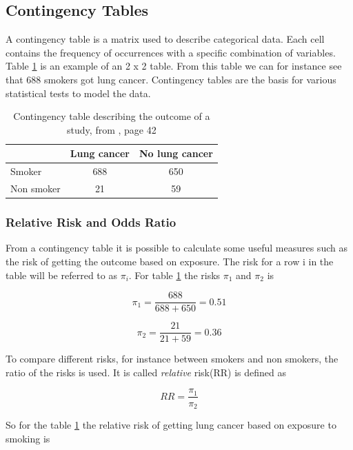 \documentclass[10pt,a4paper]{report}
\begin{document}
\subsection{Contingency Tables}
A contingency table is a matrix used to describe categorical data. Each cell contains the frequency of occurrences with a specific combination of variables. Table \ref{table:contingency_table} is an example of an 2 x 2 table. From this table we can for instance see that 688 smokers got lung cancer. Contingency tables are the basis for various statistical tests to model the data.\cite{agresti_categorical}

\begin{table}[h]
\begin{tabular}{ l c c }
  \hline
  & Lung cancer & No lung cancer\\
  \hline
  Smoker & 688 & 650 \\
  Non smoker & 21 & 59 \\
  \hline  
\end{tabular}
\caption{Contingency table describing the outcome of a study, from \cite{agresti_categorical}, page 42}
\label{table:contingency_table}
\end{table}

\subsubsection{Relative Risk and Odds Ratio}
From a contingency table it is possible to calculate some useful measures such as the risk of getting the outcome based on exposure. The risk for a row i in the table will be referred to as $\pi_i$. For table \ref{table:contingency_table} the risks $\pi_1$ and $\pi_2$ is

\begin{equation}
\pi_1=\frac{688}{688+650}=0.51
\end{equation}

\begin{equation}
\pi_2=\frac{21}{21+59}=0.36
\end{equation}

To compare different risks, for instance between smokers and non smokers, the ratio of the risks is used\cite{agresti_categorical}. It is called \emph{relative} risk(RR) is defined as\cite{agresti_categorical} 

\begin{equation}
RR=\frac{\pi_1}{\pi_2}
\end{equation}

So for the table \ref{table:contingency_table} the relative risk of getting lung cancer based on exposure to smoking is
\end{document}
